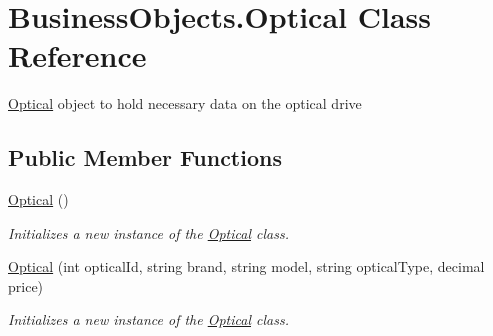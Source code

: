 \hypertarget{class_business_objects_1_1_optical}{}\section{Business\+Objects.\+Optical Class Reference}
\label{class_business_objects_1_1_optical}


\hyperlink{class_business_objects_1_1_optical}{Optical} object to hold necessary data on the optical drive  


\subsection*{Public Member Functions}
\begin{DoxyCompactItemize}
\item 
\hyperlink{class_business_objects_1_1_optical_a81db21dd419123fe11893f988facd077}{Optical} ()
\begin{DoxyCompactList}\small\item\em Initializes a new instance of the \hyperlink{class_business_objects_1_1_optical}{Optical} class. \end{DoxyCompactList}\item 
\hyperlink{class_business_objects_1_1_optical_a85e001030041386047f105975754144d}{Optical} (int optical\+Id, string brand, string model, string optical\+Type, decimal price)
\begin{DoxyCompactList}\small\item\em Initializes a new instance of the \hyperlink{class_business_objects_1_1_optical}{Optical} class. \end{DoxyCompactList}\end{DoxyCompactItemize}
